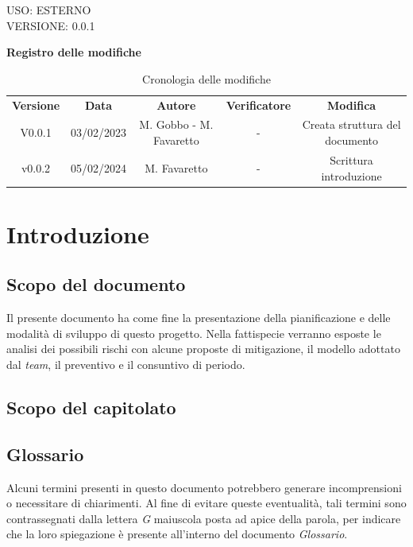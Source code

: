 \documentclass[5pt]{article}
\begin{document}
\begin{flushright}
    \begin{spacing}{1}
        USO: ESTERNO\\
        VERSIONE: 0.0.1\\
    \end{spacing}
\end{flushright}


\restoregeometry

\pagebreak

\textbf{\Large Registro delle modifiche}
\begin{table}[ht]
\centering
\begin{tabular}{|c|c|c|c|c|}
\hline
\textbf{Versione} & \textbf{Data} & \textbf{Autore} & \textbf{Verificatore} & \textbf{Modifica} \\
V0.0.1 & 03/02/2023 & M. Gobbo - M. Favaretto & - & Creata struttura del documento \\
\hline
v0.0.2 & 05/02/2024 & M. Favaretto & - & Scrittura introduzione \\
\hline
\end{tabular}
\caption{Cronologia delle modifiche}
\label{tab:conference}
\end{table}

\pagebreak
\tableofcontents
\pagebreak

\section{Introduzione}
\subsection{Scopo del documento}
Il presente documento ha come fine la presentazione della pianificazione e delle modalità di sviluppo di questo progetto. 
Nella fattispecie verranno esposte le analisi dei possibili rischi con alcune proposte di mitigazione, il modello adottato dal \textit{team}, 
il preventivo e il consuntivo di periodo.
\subsection{Scopo del capitolato}
\subsection{Glossario}
Alcuni termini presenti in questo documento potrebbero generare incomprensioni o necessitare di chiarimenti. 
Al fine di evitare queste eventualità, tali termini sono contrassegnati dalla lettera \textit{G} maiuscola posta ad apice della parola, 
per indicare che la loro spiegazione è presente all'interno del documento \textit{Glossario}.
\end{document}

